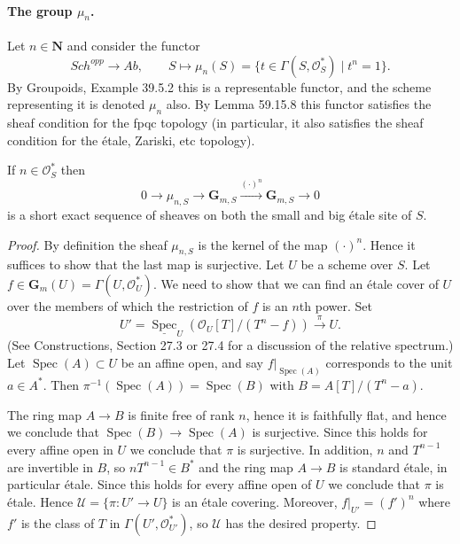 \paragraph{The group $\mu_n$.}
Let $n\in\mathbf N$ and consider the functor
\[
\mathit{Sch}^{opp}\longrightarrow\mathit{Ab},\qquad S\longmapsto\mu_n(S)=\{t\in\Gamma(S,\mathcal O_S^*)\mid t^n=1\}.
\]
By Groupoids, Example 39.5.2 this is a representable functor, and the scheme representing it is denoted $\mu_n$ also. By Lemma 59.15.8 this functor satisfies the sheaf condition for the fpqc topology (in particular, it also satisfies the sheaf condition for the étale, Zariski, etc topology).

\begin{lemma}[59.28.1]
If $n\in\mathcal O_S^*$ then
\[0\to\mu_{n,S}\to\mathbf G_{m,S}\xrightarrow{(\cdot)^n}\mathbf G_{m,S}\to0\]
is a short exact sequence of sheaves on both the small and big étale site of $S$.
\end{lemma}
\begin{proof}
By definition the sheaf $\mu_{n,S}$ is the kernel of the map $(\cdot)^n$. Hence it suffices to show that the last map is surjective. Let $U$ be a scheme over $S$. Let $f\in\mathbf G_m(U)=\Gamma(U,\mathcal O_U^*)$. We need to show that we can find an étale cover of $U$ over the members of which the restriction of $f$ is an $n$th power. Set
\[U'=\underline{\operatorname{Spec}}_U(\mathcal O_U[T]/(T^n-f))\xrightarrow{\pi}U.\]
(See Constructions, Section 27.3 or 27.4 for a discussion of the relative spectrum.) Let $\operatorname{Spec}(A)\subset U$ be an affine open, and say $f|_{\operatorname{Spec}(A)}$ corresponds to the unit $a\in A^*$. Then $\pi^{-1}(\operatorname{Spec}(A))=\operatorname{Spec}(B)$ with $B=A[T]/(T^n-a)$.

The ring map $A\to B$ is finite free of rank $n$, hence it is faithfully flat, and hence we conclude that $\operatorname{Spec}(B)\to\operatorname{Spec}(A)$ is surjective. Since this holds for every affine open in $U$ we conclude that $\pi$ is surjective. In addition, $n$ and $T^{n-1}$ are invertible in $B$, so $nT^{n-1}\in B^*$ and the ring map $A\to B$ is standard étale, in particular étale. Since this holds for every affine open of $U$ we conclude that $\pi$ is étale. Hence $\mathcal U=\{\pi:U'\to U\}$ is an étale covering. Moreover, $f|_{U'}=(f')^n$ where $f'$ is the class of $T$ in $\Gamma(U',\mathcal O_{U'}^*)$, so $\mathcal U$ has the desired property.
\end{proof}

